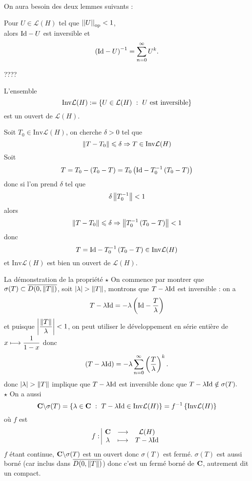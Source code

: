 \documentclass[a4paper,11pt, twoside]{article}
\begin{document}
On aura besoin des deux lemmes suivants : 


\begin{lemme}
  Pour $U\in\mathcal L(H)$ tel que $\left|\left|U\right|\right|_{\mathrm{op}}<1$,\\

  alors $\mathrm{Id}-U$ est inversible et 
  $$\left(\mathrm{Id}-U\right)^{-1}=\sum_{n=0}^{\infty}U^k.$$
\end{lemme}


\begin{Proof}
  ????
\end{Proof}


\begin{lemme}
  L'ensemble 
  $$\mathrm{Inv}\mathcal L(H):=\left\{U\in\mathcal L(H)\ :\ U\text{ est inversible}\right\}$$
  est un ouvert de $\mathcal L(H).$
\end{lemme}


\begin{Proof}
  Soit $T_0\in\mathrm{Inv}\mathcal L(H)$, on cherche $\delta>0$ tel que 
  $$\left\lVert T-T_0\right\rVert\leqslant \delta\Rightarrow T\in\mathrm{Inv}\mathcal L(H)$$
  Soit 
  $$T=T_0-(T_0-T)=T_0\left(\mathrm{Id}-T_0^{-1}\left(T_0-T\right)\right)$$
  donc 
  si l'on prend $\delta$ tel que 
  $$\delta\left\lVert T_0^{-1}\right\rVert<1$$
  alors $$\left\lVert T-T_0\right\rVert\leqslant \delta\Rightarrow\left\lVert T_0^{-1}\left(T_0-T\right)\right\rVert<1$$ 
  donc
  $$T=\mathrm{Id}-T_0^{-1}\left(T_0-T\right)\in\mathrm{Inv}\mathcal L(H)$$ 
  et $\mathrm{Inv}\mathcal L(H)$ est bien un ouvert de $\mathcal L(H)$.
\end{Proof} 


\begin{ProofC}{La démonstration de la propriété}
  $\star$ On commence par montrer que $\sigma(T)\subset \overline{D(0,\left\lVert T\right\rVert)}$, soit $\abs{\lambda}>\norm{T}$, montrons que $T-\lambda \mathrm{Id}$ est inversible : on a 
  $$T-\lambda\mathrm{Id}=-\lambda\left(\mathrm{Id}-\frac{T}{\lambda}\right)$$
  et puisque $\displaystyle\left| \frac{\left\lVert T\right\rVert}{\lambda}\right|<1$, on peut utiliser le développement en série entière de $\displaystyle x\longmapsto\frac{1}{1-x}$
  donc 
  $$\left(T-\lambda\mathrm{Id}\right)=-\lambda\sum_{n=0}^\infty\left(\frac{T}{\lambda}\right)^k.$$
  donc $\abs{\lambda}>\norm{T}$ implique que $T-\lambda \mathrm{Id}$ est inversible donc que $T-\lambda\mathrm{Id}\notin\sigma(T).$\\

  $\star$ On a aussi 
  $$\C\backslash\sigma(T)=\ens{\lambda\in\C\ :\ T-\lambda\Id\in\mathrm{Inv}\mathcal L(H)}=f^{-1}\ens{\mathrm{Inv}\mathcal L(H)}$$
  où $f$ est 
  $$f:\begin{array}{|ccc}
    \mathbf C&\longrightarrow&\mathcal L(H)\\
    \lambda&\longmapsto&T-\lambda\mathrm{Id}
  \end{array}$$
  $f$ étant continue, $\mathbf C\backslash\sigma(T)$ est un ouvert donc $\sigma(T)$ est fermé. $\sigma(T)$ est aussi borné (car inclus dans $\overline{D(0,\left\lVert T\right\rVert)}$) donc c'est un fermé borné de $\mathbf C$, autrement dit un compact.
\end{ProofC}
\end{document}
